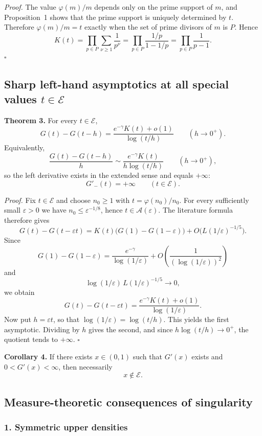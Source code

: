 \medskip
\noindent\textit{Proof.}
The value $\varphi(m)/m$ depends only on the prime support of $m$, and Proposition~1 shows that the prime support is uniquely determined by $t$. Therefore $\varphi(m)/m=t$ exactly when the set of prime divisors of $m$ is $P$. Hence
\[
K(t)=\prod_{p\in P}\sum_{\nu\ge1}\frac1{p^\nu}
=\prod_{p\in P}\frac{1/p}{1-1/p}
=\prod_{p\in P}\frac1{p-1}.
\]
\hfill$\square$

\subsection{Sharp left-hand asymptotics at all special values $t\in\mathcal E$}

\noindent\textbf{Theorem 3.}
For every $t\in\mathcal E$,
\[
G(t)-G(t-h)=\frac{e^{-\gamma}K(t)+o(1)}{\log(t/h)}
\qquad(h\to0^+).
\]
Equivalently,
\[
\frac{G(t)-G(t-h)}{h}
\sim
\frac{e^{-\gamma}K(t)}{h\log(t/h)}
\qquad(h\to0^+),
\]
so the left derivative exists in the extended sense and equals $+\infty$:
\[
G'_-(t)=+\infty
\qquad(t\in\mathcal E).
\]

\medskip
\noindent\textit{Proof.}
Fix $t\in\mathcal E$ and choose $n_0\ge1$ with $t=\varphi(n_0)/n_0$. For every sufficiently small $\varepsilon>0$ we have $n_0\le\varepsilon^{-1/8}$, hence $t\in\mathcal A(\varepsilon)$. The literature formula therefore gives
\[
G(t)-G(t-\varepsilon t)=K(t)\bigl(G(1)-G(1-\varepsilon)\bigr)+O\bigl(L(1/\varepsilon)^{-1/5}\bigr).
\]
Since
\[
G(1)-G(1-\varepsilon)=\frac{e^{-\gamma}}{\log(1/\varepsilon)}+O\!\left(\frac1{(\log(1/\varepsilon))^2}\right)
\]
and
\[
\log(1/\varepsilon)\,L(1/\varepsilon)^{-1/5}\to0,
\]
we obtain
\[
G(t)-G(t-\varepsilon t)=\frac{e^{-\gamma}K(t)+o(1)}{\log(1/\varepsilon)}.
\]
Now put $h=\varepsilon t$, so that $\log(1/\varepsilon)=\log(t/h)$. This yields the first asymptotic. Dividing by $h$ gives the second, and since $h\log(t/h)\to0^+$, the quotient tends to $+\infty$. \hfill$\square$

\medskip
\noindent\textbf{Corollary 4.}
If there exists $x\in(0,1)$ such that $G'(x)$ exists and $0<G'(x)<\infty$, then necessarily
\[
x\notin\mathcal E.
\]

\subsection{Measure-theoretic consequences of singularity}

\subsubsection*{1. Symmetric upper densities}


